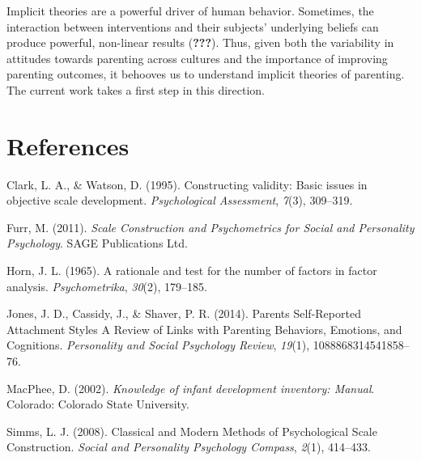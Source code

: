 \documentclass[floatsintext,man]{apa6}
\theoremstyle{definition}
\theoremstyle{definition}
\theoremstyle{definition}
\theoremstyle{remark}
\begin{document}
Implicit theories are a powerful driver of human behavior. Sometimes,
the interaction between interventions and their subjects' underlying
beliefs can produce powerful, non-linear results ({\textbf{???}}). Thus,
given both the variability in attitudes towards parenting across
cultures and the importance of improving parenting outcomes, it behooves
us to understand implicit theories of parenting. The current work takes
a first step in this direction.

\newpage

\section{References}\label{references}

\begingroup
\setlength{\parindent}{-0.5in} \setlength{\leftskip}{0.5in}

\hypertarget{refs}{}
\hypertarget{ref-clark1995}{}
Clark, L. A., \& Watson, D. (1995). Constructing validity: Basic issues
in objective scale development. \emph{Psychological Assessment},
\emph{7}(3), 309--319.

\hypertarget{ref-furr2011}{}
Furr, M. (2011). \emph{Scale Construction and Psychometrics for Social
and Personality Psychology}. SAGE Publications Ltd.

\hypertarget{ref-horn1965}{}
Horn, J. L. (1965). A rationale and test for the number of factors in
factor analysis. \emph{Psychometrika}, \emph{30}(2), 179--185.

\hypertarget{ref-jones2014}{}
Jones, J. D., Cassidy, J., \& Shaver, P. R. (2014). Parents
Self-Reported Attachment Styles A Review of Links with Parenting
Behaviors, Emotions, and Cognitions. \emph{Personality and Social
Psychology Review}, \emph{19}(1), 1088868314541858--76.

\hypertarget{ref-macphee2002}{}
MacPhee, D. (2002). \emph{Knowledge of infant development inventory:
Manual}. Colorado: Colorado State University.

\hypertarget{ref-simms2008}{}
Simms, L. J. (2008). Classical and Modern Methods of Psychological Scale
Construction. \emph{Social and Personality Psychology Compass},
\emph{2}(1), 414--433.

\endgroup
\end{document}
